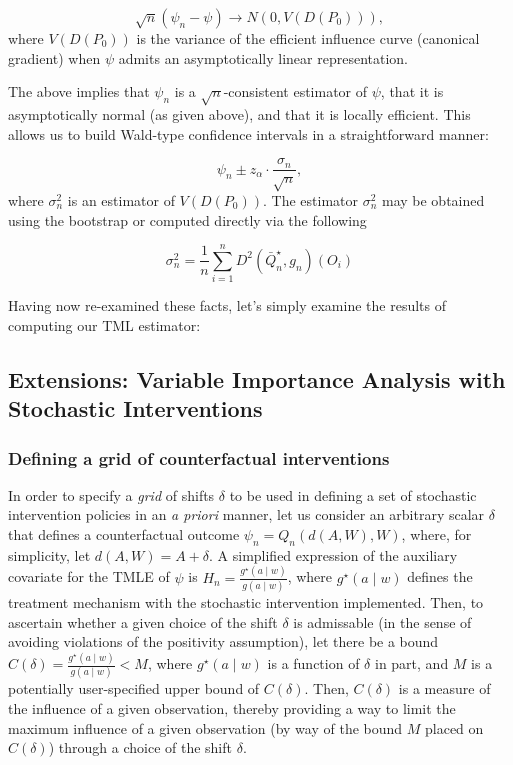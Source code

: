 \documentclass[12pt, krantz2,]{krantz}
\theoremstyle{definition}
\theoremstyle{definition}
\theoremstyle{definition}
\newcommand{\1}{\mathbbm{1}}
\begin{document}
\[\sqrt{n}(\psi_n - \psi) \to N(0, V(D(P_0))),\]
where \(V(D(P_0))\) is the variance of the efficient influence curve (canonical
gradient) when \(\psi\) admits an asymptotically linear representation.

The above implies that \(\psi_n\) is a \(\sqrt{n}\)-consistent estimator of \(\psi\),
that it is asymptotically normal (as given above), and that it is locally
efficient. This allows us to build Wald-type confidence intervals in a
straightforward manner:

\[\psi_n \pm z_{\alpha} \cdot \frac{\sigma_n}{\sqrt{n}},\]
where \(\sigma_n^2\) is an estimator of \(V(D(P_0))\). The estimator \(\sigma_n^2\)
may be obtained using the bootstrap or computed directly via the following

\[\sigma_n^2 = \frac{1}{n} \sum_{i = 1}^{n} D^2(\bar{Q}_n^{\star}, g_n)(O_i)\]

Having now re-examined these facts, let's simply examine the results of
computing our TML estimator:

\hypertarget{extensions-variable-importance-analysis-with-stochastic-interventions}{%
\subsection{Extensions: Variable Importance Analysis with Stochastic Interventions}\label{extensions-variable-importance-analysis-with-stochastic-interventions}}

\hypertarget{defining-a-grid-of-counterfactual-interventions}{%
\subsubsection{Defining a grid of counterfactual interventions}\label{defining-a-grid-of-counterfactual-interventions}}

In order to specify a \emph{grid} of shifts \(\delta\) to be used in defining a set of
stochastic intervention policies in an \emph{a priori} manner, let us consider an
arbitrary scalar \(\delta\) that defines a counterfactual outcome \(\psi_n = Q_n(d(A, W), W)\), where, for simplicity, let \(d(A, W) = A + \delta\). A
simplified expression of the auxiliary covariate for the TMLE of \(\psi\) is
\(H_n = \frac{g^{\star}(a \mid w)}{g(a \mid w)}\), where \(g^{\star}(a \mid w)\)
defines the treatment mechanism with the stochastic intervention implemented.
Then, to ascertain whether a given choice of the shift \(\delta\) is admissable
(in the sense of avoiding violations of the positivity assumption), let there
be a bound \(C(\delta) = \frac{g^{\star}(a \mid w)}{g(a \mid w)} < M\), where
\(g^{\star}(a \mid w)\) is a function of \(\delta\) in part, and \(M\) is a potentially
user-specified upper bound of \(C(\delta)\). Then, \(C(\delta)\) is a measure of
the influence of a given observation, thereby providing a way to limit the
maximum influence of a given observation (by way of the bound \(M\) placed on
\(C(\delta)\)) through a choice of the shift \(\delta\).
\end{document}
